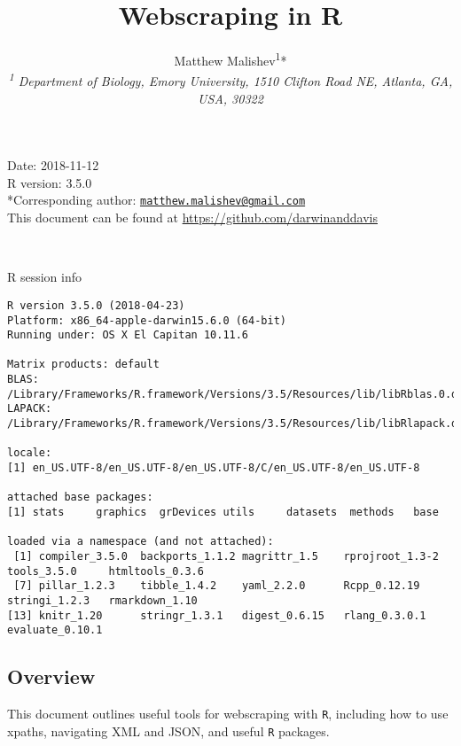 \documentclass[10,portrait]{article}
\title{Webscraping in R}
\author{Matthew
Malishev\textsuperscript{1}*\\[2\baselineskip]\emph{\textsuperscript{1}
Department of Biology, Emory University, 1510 Clifton Road NE, Atlanta,
GA, USA, 30322}}
\date{}
\newenvironment{Shaded}{\begin{snugshade}}{\end{snugshade}}
\newcommand{\OperatorTok}[1]{\textcolor[rgb]{0.81,0.36,0.00}{\textbf{#1}}}
\newcommand{\NormalTok}[1]{#1}
\begin{document}
\maketitle

{
\hypersetup{linkcolor=black}
\setcounter{tocdepth}{4}
\tableofcontents
}
\newpage   

Date: 2018-11-12\\
R version: 3.5.0\\
*Corresponding author:
\href{mailto:matthew.malishev@gmail.com}{\nolinkurl{matthew.malishev@gmail.com}}\\
This document can be found at \url{https://github.com/darwinanddavis}

~

R session info

\begin{Shaded}
\end{Shaded}

\begin{verbatim}
R version 3.5.0 (2018-04-23)
Platform: x86_64-apple-darwin15.6.0 (64-bit)
Running under: OS X El Capitan 10.11.6

Matrix products: default
BLAS: /Library/Frameworks/R.framework/Versions/3.5/Resources/lib/libRblas.0.dylib
LAPACK: /Library/Frameworks/R.framework/Versions/3.5/Resources/lib/libRlapack.dylib

locale:
[1] en_US.UTF-8/en_US.UTF-8/en_US.UTF-8/C/en_US.UTF-8/en_US.UTF-8

attached base packages:
[1] stats     graphics  grDevices utils     datasets  methods   base     

loaded via a namespace (and not attached):
 [1] compiler_3.5.0  backports_1.1.2 magrittr_1.5    rprojroot_1.3-2 tools_3.5.0     htmltools_0.3.6
 [7] pillar_1.2.3    tibble_1.4.2    yaml_2.2.0      Rcpp_0.12.19    stringi_1.2.3   rmarkdown_1.10 
[13] knitr_1.20      stringr_1.3.1   digest_0.6.15   rlang_0.3.0.1   evaluate_0.10.1
\end{verbatim}

\newpage  

\subsection{Overview}\label{overview}

This document outlines useful tools for webscraping with \texttt{R},
including how to use xpaths, navigating XML and JSON, and useful
\texttt{R} packages.
\end{document}
